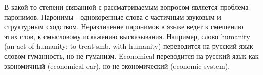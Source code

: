 В какой-то степени связанной с рассматриваемым вопросом является проблема паронимов. Паронимы - однокоренные слова с частичным звуковым и структурным сходством. Неразличение паронимов в языке ведет к смешению этих слов, к смысловому искажению высказывания. Например, слово humanity (an act of humanity; to treat smb. with humanity) переводится на русский язык словом гуманность, но не гуманизм. Economical переводится на русский язык как экономичный (economical car), но не экономический (economic system). 

